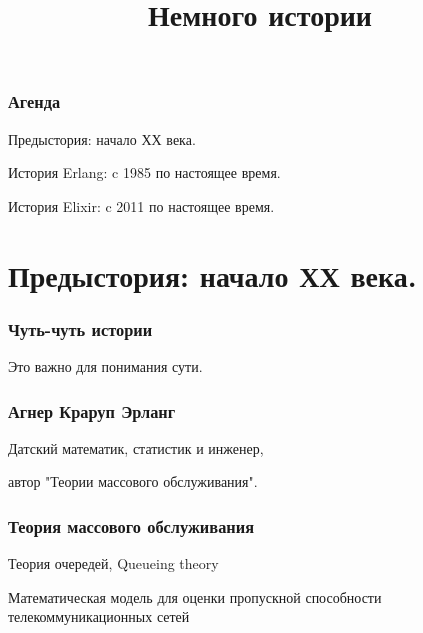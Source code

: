 \documentclass[10pt]{beamer}
\title{Немного истории}
\begin{document}
\maketitle

\begin{frame}
\frametitle{Агенда}
\centering
Предыстория: начало ХХ века.
\par \bigskip
История Erlang: c 1985 по настоящее время.
\par \bigskip
История Elixir: c 2011 по настоящее время.
\end{frame}


\section{Предыстория: начало ХХ века.}

{
\begin{frame}
\frametitle{Чуть-чуть истории}
\centering
Это важно для понимания сути.
\end{frame}
}

\begin{frame}
\frametitle{Агнер Краруп Эрланг}
\centering
Датский математик, статистик и инженер,
\par \bigskip
автор "Теории массового обслуживания".
\end{frame}

\begin{frame}
\frametitle{Теория массового обслуживания}
\par \bigskip
Теория очередей, Queueing theory
\par \bigskip
Математическая модель для оценки пропускной способности телекоммуникационных сетей
\end{frame}
\end{document}
